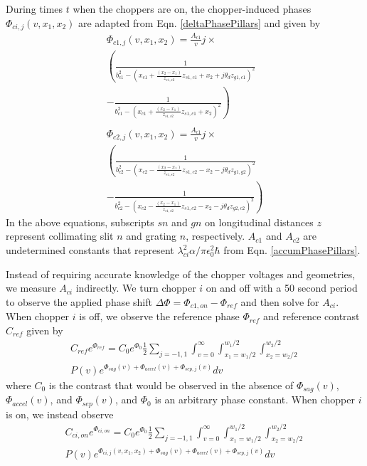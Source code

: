 \documentclass[twocolumn, prl,showpacs,superscriptaddress]{revtex4-1}   %
\newcommand{\eqnref}[1]{Eqn. \eqref{#1}}
\begin{document}
During times $t$ when the choppers are on, the chopper-induced phases $\Phi_{ci,j}(v,x_1,x_2)$ are adapted from \eqnref{deltaPhasePillars} and given by
\begin{align}
	\Phi_{c1,j}(v,x_1,x_2) = \frac{A_{c1}}{v}j \times \nonumber \\
	\left(
		\frac{1}{b_{c1}^2 -
			(x_{c1} + \frac{(x_2-x_1)}{z_{s1,s2}}z_{s1,c1} + x_2 + j\theta_d z_{g1,c1})^2
		}
		\right. \nonumber \\ - \left.
		\frac{1}{b_{c1}^2 -
			(x_{c1} + \frac{(x_2-x_1)}{z_{s1,s2}}z_{s1,c1} + x_2)^2
		}
	\right)
	\nonumber \\ 
	\nonumber \\	
	\Phi_{c2,j}(v,x_1,x_2) = \frac{A_{c1}}{v}j \times \nonumber \\
	\left(
		\frac{1}{b_{c2}^2 -
			(x_{c2} - \frac{(x_2-x_1)}{z_{s1,s2}}z_{s1,c2} - x_2 - j\theta_d z_{g1,g2})^2
		}
		\right. \nonumber \\ - \left.
		\frac{1}{b_{c2}^2 -
			(x_{c2} - \frac{(x_2-x_1)}{z_{s1,s2}}z_{s1,c2} - x_2 - j\theta_d z_{g2,c2})^2
		}
	\right)
	\label{phic1c2}
\end{align}
In the above equations, subscripts $sn$ and $gn$ on longitudinal distances $z$ represent collimating slit $n$ and grating $n$, respectively. $A_{c1}$ and $A_{c2}$ are undetermined constants that represent $\lambda_{ci}^2 \alpha / \pi \epsilon_0^2 \hbar$ from \eqnref{accumPhasePillars}. 

Instead of requiring accurate knowledge of the chopper voltages and geometries, we measure $A_{ci}$ indirectly. We turn chopper $i$ on and off with a 50 second period to observe the applied phase shift $\Delta\Phi = \Phi_{c1,on} - \Phi_{ref}$ and then solve for $A_{ci}$. When chopper $i$ is off, we observe the reference phase $\Phi_{ref}$ and reference contrast $C_{ref}$ given by 
\begin{align}
	C_{ref}e^{\Phi_{ref}} = 
		C_0e^{\Phi_0} \frac{1}{2} \sum_{j=-1,1}
		\int_{v=0}^{\infty}
		\int_{x_1=w_1/2}^{w_1/2}
		\int_{x_2=w_2/2}^{w_2/2} 
		\nonumber \\
		P(v) e^{\Phi_{sag}(v) + \Phi_{accel}(v) + \Phi_{sep,j}(v)} 
		dv
	\label{CPChoppersRef}
\end{align}
where $C_0$ is the contrast that would be observed in the absence of $\Phi_{sag}(v)$, $\Phi_{accel}(v)$, and $\Phi_{sep}(v)$, and $\Phi_0$ is an arbitrary phase constant. When chopper $i$ is on, we instead observe
\begin{align}
	C_{ci,on}e^{\Phi_{ci,on}} = 
		C_0e^{\Phi_0} \frac{1}{2} \sum_{j=-1,1}
		\int_{v=0}^{\infty}
		\int_{x_1=w_1/2}^{w_1/2}
		\int_{x_2=w_2/2}^{w_2/2} 
		\nonumber \\
		P(v) e^{\Phi_{ci,j}(v,x_1,x_2) + \Phi_{sag}(v) + \Phi_{accel}(v) + \Phi_{sep,j}(v)} 
		dv
	\label{CPChoppersOn}
\end{align}
\end{document}
